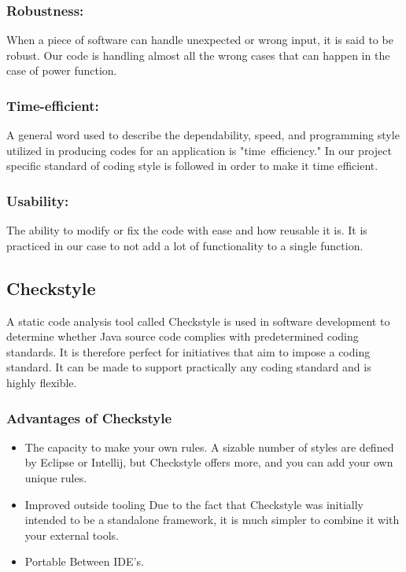 \documentclass[a4paper,12pt]{article}
\begin{document}
\subsubsection{\bfseries Robustness:}\item When a piece of software can handle unexpected or wrong input, it is said to be robust. Our code is handling almost all the wrong cases that can happen in the case of power function.\\
\subsubsection{\bfseries Time-efficient:}\item A general word used to describe the dependability, speed, and programming style utilized in producing codes for an application is "time efficiency." In our project specific standard of coding style is followed in order to make it time efficient.\\
\subsubsection{\bfseries Usability:}\item The ability to modify or fix the code with ease and how reusable it is. It is practiced in our case to not add a lot of functionality to a single function.\\ 



\subsection{Checkstyle}
\item A static code analysis tool called Checkstyle is used in software development to determine whether Java source code complies with predetermined coding standards. It is therefore perfect for initiatives that aim to impose a coding standard. It can be made to support practically any coding standard and is highly flexible.


\subsubsection{Advantages of Checkstyle}
\begin{itemize}
\item The capacity to make your own rules. A sizable number of styles are defined by Eclipse or Intellij, but Checkstyle offers more, and you can add your own unique rules. 
\item  Improved outside tooling Due to the fact that Checkstyle was initially intended to be a standalone framework, it is much simpler to combine it with your external tools.
\item Portable Between IDE's.
\end{itemize}
\end{document}
